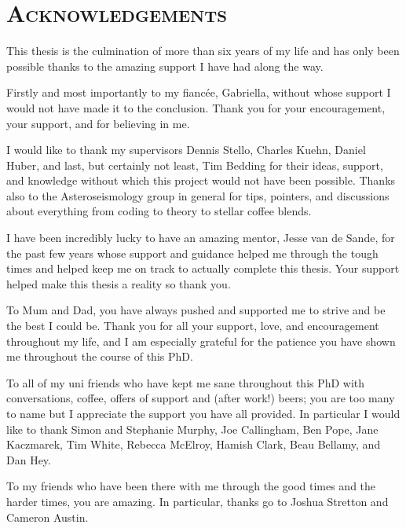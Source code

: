 \chapter*{\textsc{Acknowledgements}}

\vspace{-0.8cm}

This thesis is the culmination of more than six years of my life and has only been possible thanks to the amazing support I have had along the way. 

Firstly and most importantly to my fianc\'ee, Gabriella, without whose support I would not have made it to the conclusion. Thank you for your encouragement, your support, and for believing in me. %

I would like to thank my supervisors Dennis Stello, Charles Kuehn, Daniel Huber, and last, but certainly not least, Tim Bedding for their ideas, support, and knowledge without which this project would not have been possible. Thanks also to the Asteroseismology group in general for tips, pointers, and discussions about everything from coding to theory to stellar coffee blends. 

I have been incredibly lucky to have an amazing mentor, Jesse van de Sande, for the past few years whose support and guidance helped me through the tough times and helped keep me on track to actually complete this thesis. Your support helped make this thesis a reality so thank you.

To Mum and Dad, you have always pushed and supported me to strive and be the best I could be. Thank you for all your support, love, and encouragement throughout my life, and I am especially grateful for the patience you have shown me throughout the course of this PhD.

To all of my uni friends who have kept me sane throughout this PhD with conversations, coffee, offers of support and (after work!) beers; you are too many to name but I appreciate the support you have all provided. In particular I would like to thank Simon and Stephanie Murphy, Joe Callingham, Ben Pope, Jane Kaczmarek, Tim White, Rebecca McElroy, Hamish Clark, Beau Bellamy, and Dan Hey. 

To my friends who have been there with me through the good times and the harder times, you are amazing. In particular, thanks go to Joshua Stretton and Cameron Austin.



